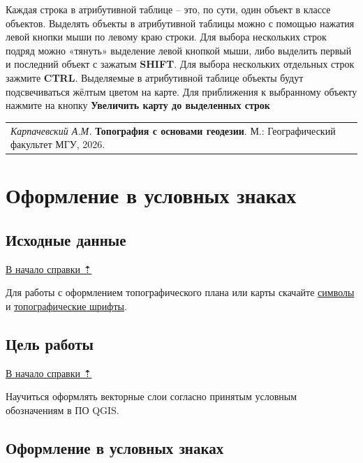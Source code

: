 \documentclass[
  russian,
  letterpaper,
  DIV=11,
  numbers=noendperiod]{scrreprt}
\begin{document}
Каждая строка в атрибутивной таблице -- это, по сути, один объект в
классе объектов. Выделять объекты в атрибутивной таблицы можно с помощью
нажатия левой кнопки мыши по левому краю строки. Для выбора нескольких
строк подряд можно «тянуть» выделение левой кнопкой мыши, либо выделить
первый и последний объект с зажатым \textbf{SHIFT}. Для выбора
нескольких отдельных строк зажмите \textbf{CTRL}. Выделяемые в
атрибутивной таблице объекты будут подсвечиваться жёлтым цветом на
карте. Для приближения к выбранному объекту нажмите на кнопку
\textbf{Увеличить карту до выделенных строк}

\begin{longtable}[]{@{}l@{}}
\toprule\noalign{}
\endhead
\bottomrule\noalign{}
\endlastfoot
\emph{Карпачевский А.М.} \textbf{Топография с основами геодезии}. М.:
Географический факультет МГУ, 2026. \\
\end{longtable}


\chapter{Оформление в условных
знаках}\label{ux43eux444ux43eux440ux43cux43bux435ux43dux438ux435-ux432-ux443ux441ux43bux43eux432ux43dux44bux445-ux437ux43dux430ux43aux430ux445}

\label{symbols}{}

\section{Исходные данные}\label{symbols-initial}

\hyperref[symbols]{В начало справки ⇡}

Для работы с оформлением топографического плана или карты скачайте
\href{https://yadi.sk/d/mb1wTvAUUAgVUQ}{символы} и
\href{https://yadi.sk/d/G_3EVFLqg3C5pA}{топографические шрифты}.

\section{Цель работы}\label{symbols-task}

\hyperref[symbols]{В начало справки ⇡}

Научиться оформлять векторные слои согласно принятым условным
обозначениям в ПО QGIS.

\section{Оформление в условных знаках}\label{symbols-symbols}
\end{document}
